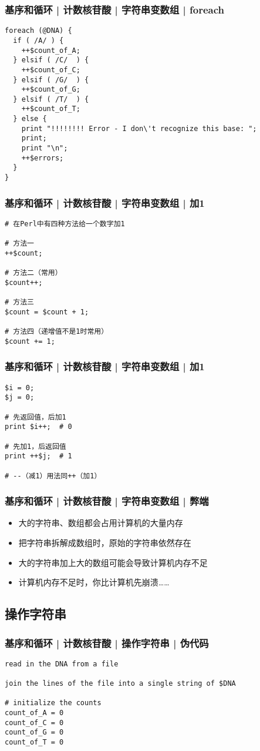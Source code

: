 \begin{frame}[fragile]
  \frametitle{基序和循环 | 计数核苷酸 | 字符串变数组 | foreach}
\begin{lstlisting}[basicstyle=\small\tt]
foreach (@DNA) {
  if ( /A/ ) {
    ++$count_of_A;
  } elsif ( /C/  ) {
    ++$count_of_C;
  } elsif ( /G/  ) {
    ++$count_of_G;
  } elsif ( /T/  ) {
    ++$count_of_T;
  } else {
    print "!!!!!!!! Error - I don\'t recognize this base: ";
    print;
    print "\n";
    ++$errors;
  }
}
\end{lstlisting}
\end{frame}

\begin{frame}[fragile]
  \frametitle{基序和循环 | 计数核苷酸 | 字符串变数组 | \alert{加1}}
\begin{lstlisting}
# 在Perl中有四种方法给一个数字加1

# 方法一
++$count;

# 方法二（常用）
$count++;

# 方法三
$count = $count + 1;

# 方法四（递增值不是1时常用）
$count += 1;
\end{lstlisting}
\end{frame}

\begin{frame}[fragile]
  \frametitle{基序和循环 | 计数核苷酸 | 字符串变数组 | \alert{加1}}
\begin{lstlisting}
$i = 0;
$j = 0;

# 先返回值，后加1
print $i++;  # 0

# 先加1，后返回值
print ++$j;  # 1

# --（减1）用法同++（加1）
\end{lstlisting}
\end{frame}

\begin{frame}
  \frametitle{基序和循环 | 计数核苷酸 | 字符串变数组 | 弊端}
  \begin{itemize}
    \item 大的字符串、数组都会占用计算机的大量内存
    \item 把字符串拆解成数组时，原始的字符串依然存在
    \item 大的字符串加上大的数组可能会导致计算机内存不足
    \item 计算机内存不足时，你比计算机先崩溃……
  \end{itemize}
\end{frame}

\subsection{操作字符串}
\begin{frame}[fragile]
  \frametitle{基序和循环 | 计数核苷酸 | 操作字符串 | 伪代码}
\begin{lstlisting}
read in the DNA from a file

join the lines of the file into a single string of $DNA

# initialize the counts
count_of_A = 0
count_of_C = 0
count_of_G = 0
count_of_T = 0
\end{lstlisting}
\end{frame}


